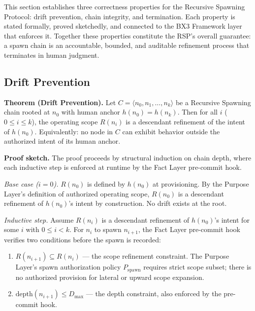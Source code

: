 This section establishes three correctness properties for the Recursive Spawning Protocol: drift prevention, chain integrity, and termination. Each property is stated formally, proved sketchedly, and connected to the BX3 Framework layer that enforces it. Together these properties constitute the RSP's overall guarantee: a spawn chain is an accountable, bounded, and auditable refinement process that terminates in human judgment.

\subsection{Drift Prevention}
\label{sec:rs-drift-prevention}

\medskip
\noindent\textbf{Theorem (Drift Prevention).} Let $C = \langle n_0, n_1, \ldots, n_k \rangle$ be a Recursive Spawning chain rooted at $n_0$ with human anchor $h(n_0) = h(n_k)$. Then for all $i$ ($0 \leq i \leq k$), the operating scope $R(n_i)$ is a descendant refinement of the intent of $h(n_0)$. Equivalently: no node in $C$ can exhibit behavior outside the authorized intent of its human anchor.

\medskip
\noindent\textbf{Proof sketch.} The proof proceeds by structural induction on chain depth, where each inductive step is enforced at runtime by the Fact Layer pre-commit hook.

\medskip
\textit{Base case ($i=0$).} $R(n_0)$ is defined by $h(n_0)$ at provisioning. By the Purpose Layer's definition of authorized operating scope, $R(n_0)$ is a descendant refinement of $h(n_0)$'s intent by construction. No drift exists at the root.

\medskip
\textit{Inductive step.} Assume $R(n_i)$ is a descendant refinement of $h(n_0)$'s intent for some $i$ with $0 \leq i < k$. For $n_i$ to spawn $n_{i+1}$, the Fact Layer pre-commit hook verifies two conditions before the spawn is recorded:

\begin{enumerate}
    \item[(a)] $R(n_{i+1}) \subseteq R(n_i)$ --- the scope refinement constraint. The Purpose Layer's spawn authorization policy $P_{\mathrm{spawn}}$ requires strict scope subset; there is no authorized provision for lateral or upward scope expansion.
    \item[(b)] $\mathrm{depth}(n_{i+1}) \leq D_{\mathrm{max}}$ --- the depth constraint, also enforced by the pre-commit hook.
\end{enumerate}

